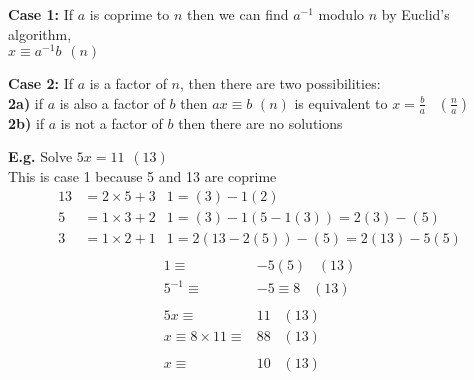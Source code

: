 \documentclass[11pt]{article}
\begin{document}
\begin{flushleft}
	\textbf{Case 1:} If $a$ is coprime to $n$ then we can find $a^{-1}$ modulo $n$ by Euclid's algorithm,\\ \hspace{40pt} $x \equiv a^{-1}b \hspace{5pt} (n) $


	\textbf{Case 2:} If $a$ is a factor of $n$, then there are two possibilities:\\
	\hspace{40pt} \textbf{2a)} if $a$ is also a factor of $b$ then $ax \equiv b$ \hspace{3pt} $(n)$ is equivalent to $x = \frac{b}{a} \hspace{10pt} (\frac{n}{a})$\\
	\hspace{40pt} \textbf{2b)} if $a$ is not a factor of $b$ then there are no solutions

\end{flushleft}
\newpage 
\begin{flushleft}
	\textbf{E.g.} Solve $5x = 11 \hspace{5pt} (13)$\\
	This is case 1 because 5 and 13 are coprime
	\begin{align*}
		13 &= 2\times5 + 3   &1=(3) -1(2) \\
		5 &= 1\times3 + 2 &1=(3) -1(5-1(3)) = 2(3) -(5)\\
		3 &= 1\times2 + 1 & 1 =2(13 -2(5)) - (5) = 2(13)-5(5) \\
	\end{align*}
	\begin{align*}
		1\equiv& -5(5) \hspace{10pt} (13)\\
		 5^{-1} \equiv& -5 \equiv 8\hspace{10pt} (13)\\
		 \\
		5x\equiv& 11 \hspace{10pt} (13)\\
		x \equiv 8 \times 11 \equiv& 88 \hspace{10pt} (13)\\
		\\
		x \equiv & 10 \hspace{10pt} (13)
	\end{align*}
\end{flushleft}
\end{document}

